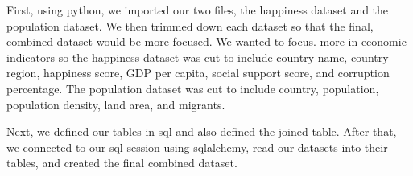 First, using python, we imported our two files, the happiness dataset and the population dataset.  We then trimmed down each dataset so that the final, combined dataset would be more focused.  We wanted to focus. more in economic indicators so the happiness dataset was cut to include country name, country region, happiness score, GDP per capita, social support score, and corruption percentage.  The population dataset was cut to include country, population, population density, land area, and migrants.

Next, we defined our tables in sql and also defined the joined table.  After that, we connected to our sql session using sqlalchemy, read our datasets into their tables, and created the final combined dataset.